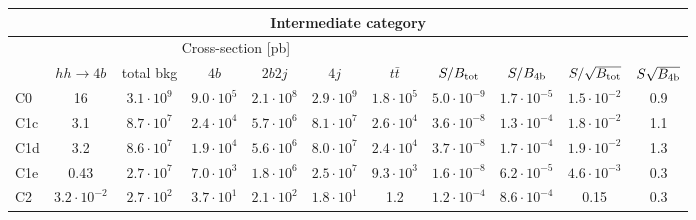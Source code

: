 \begin{tabular}{|l|cc|cccc|cccc|}
  \hline
\multicolumn{11}{|c|}{Intermediate category}\\
\hline
&  \multicolumn{6}{c|}{Cross-section [pb]} &  &  & &  \\
   &  $hh\to 4b$ &  total bkg  &   $4b$    &  $2b2j$   &   $4j$    &
$t\bar{t}$ &
$S/B_{\rm tot}$ & $S/B_{\rm 4b}$ & $S/\sqrt{B_{\rm tot}}$ & $S\sqrt{B_{\rm 4b}}$ \\
  \hline
  \hline
C0      & 16  &   $3.1\cdot 10^9$   & $9.0\cdot 10^5$ &  $2.1\cdot 10^8$ & $2.9\cdot 10^9$ & $1.8\cdot 10^5$ &   $5.0\cdot 10^{-9}$   & $1.7\cdot 10^{-5}$ &    $1.5\cdot 10^{-2}$   & 0.9\\
 C1c     & 3.1  &   $8.7\cdot 10^7 $  & $2.4\cdot 10^4$ & $5.7\cdot 10^6$ & $8.1\cdot 10^7$ & $2.6\cdot 10^4$ &   $3.6\cdot 10^{-8}$   & $1.3\cdot 10^{-4}$ &  $1.8\cdot 10^{-2}$    & 1.1 \\ 
 C1d     & 3.2  &   $8.6\cdot 10^7 $  & $1.9\cdot 10^4$ & $5.6\cdot 10^6$ & $8.0\cdot 10^7$ & $2.4\cdot 10^4$  &   $3.7\cdot 10^{-8}$   & $1.7\cdot 10^{-4}$ &   $1.9\cdot 10^{-2}$   & 1.3 \\
 C1e     & 0.43  &   $2.7\cdot 10^7$   & $7.0\cdot 10^3$ & $1.8\cdot 10^6$ & $2.5\cdot 10^7$ & $9.3\cdot 10^3$  &   $1.6\cdot 10^{-8}$   & $6.2\cdot 10^{-5}$  &     $4.6\cdot 10^{-3}$   & 0.3 \\
 C2      & $3.2\cdot 10^{-2}$  &   $2.7\cdot 10^2$   & $3.7\cdot 10^1$ & $2.1\cdot 10^2$ & $1.8\cdot 10^1$ & 1.2 &  $ 1.2\cdot 10^{-4}$   & $8.6\cdot 10^{-4}$  &      0.15   & 0.3 \\
\hline
\end{tabular}
